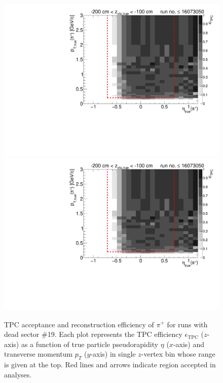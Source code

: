 \begin{figure}[hb]
\caption[TPC acceptance and reconstruction efficiency of $\pi^{+}$ for runs with dead sector \#19.]{TPC acceptance and reconstruction efficiency of $\pi^{+}$ for runs with dead sector \#19. Each plot represents the TPC efficiency $\epsilon_{\text{TPC}}$ ($z$-axis) as a function of true particle pseudorapidity $\eta$ ($x$-axis) and transverse momentum $p_{T}$ ($y$-axis) in single $z$-vertex bin whose range is given at the top. Red lines and arrows indicate region accepted in analyses.}\label{fig:tpcEff_pion_plus}
\centering
\parbox{0.495\textwidth}{
  \centering
  \includegraphics[width=\linewidth,page=3]{graphics/eff/Eff2D_TPC_pion_Plus_RunRange1.pdf}\\
  \includegraphics[width=\linewidth,page=5]{graphics/eff/Eff2D_TPC_pion_Plus_RunRange1.pdf}\\
}
\end{figure}
